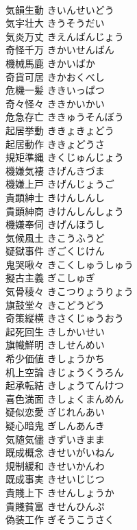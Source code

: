 \documentclass[8pt]{extreport}
\begin{document}
\begin{CJK}{UTF8}{min}
\\	気韻生動	きいんせいどう	
\\	気宇壮大	きうそうだい	
\\	気炎万丈	きえんばんじょう	
\\	奇怪千万	きかいせんばん	
\\	機械馬鹿	きかいばか	
\\	奇貨可居	きかおくべし	
\\	危機一髪	ききいっぱつ	
\\	奇々怪々	ききかいかい	
\\	危急存亡	ききゅうそんぼう	
\\	起居挙動	ききょきょどう	
\\	起居動作	ききょどうさ	
\\	規矩準縄	きくじゅんじょう	
\\	機嫌気褄	きげんきづま	
\\	機嫌上戸	きげんじょうご	
\\	貴顕紳士	きけんしんし	
\\	貴顕紳商	きけんしんしょう	
\\	機嫌奉伺	きげんほうし	
\\	気候風土	きこうふうど	
\\	疑獄事件	ぎごくじけん	
\\	鬼哭啾々	きこくしゅうしゅう	
\\	擬古主義	ぎこしゅぎ	
\\	気骨稜々	きこつりょうりょう	
\\	旗鼓堂々	きこどうどう	
\\	奇策縦横	きさくじゅうおう	
\\	起死回生	きしかいせい	
\\	旗幟鮮明	きしせんめい	
\\	希少価値	きしょうかち	
\\	机上空論	きじょうくうろん	
\\	起承転結	きしょうてんけつ	
\\	喜色満面	きしょくまんめん	
\\	疑似恋愛	ぎじれんあい	
\\	疑心暗鬼	ぎしんあんき	
\\	気随気儘	きずいきまま	
\\	既成概念	きせいがいねん	
\\	規制緩和	きせいかんわ	
\\	既成事実	きせいじじつ	
\\	貴賤上下	きせんしょうか	
\\	貴賤貧富	きせんひんぷ	
\\	偽装工作	ぎそうこうさく	

\end{CJK}
\end{document}
